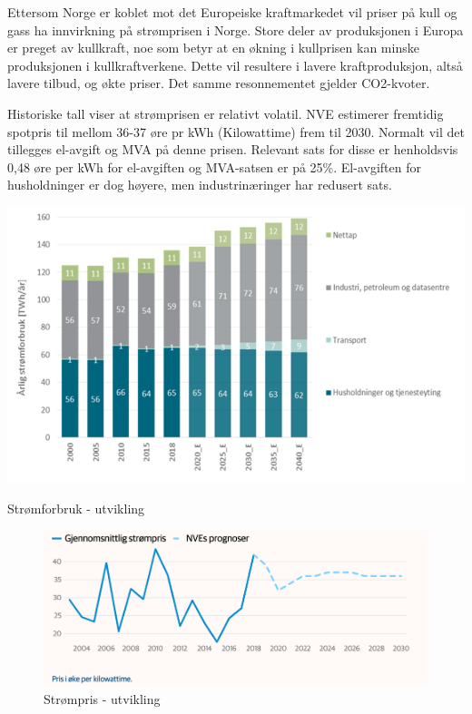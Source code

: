 \indent \newline
Ettersom Norge er koblet mot det Europeiske kraftmarkedet vil priser på kull og gass ha innvirkning på strømprisen i Norge. Store deler av produksjonen i Europa er preget av kullkraft, noe som betyr at en økning i kullprisen kan minske produksjonen i kullkraftverkene. Dette vil resultere i lavere kraftproduksjon, altså lavere tilbud, og økte priser. Det samme resonnementet gjelder CO2-kvoter.

\indent \newline
Historiske tall viser at strømprisen er relativt volatil. NVE estimerer fremtidig spotpris til mellom 36-37 øre pr kWh (Kilowattime) frem til 2030. Normalt vil det tillegges el-avgift og MVA på denne prisen. Relevant sats for disse er henholdsvis 0,48 øre per kWh for el-avgiften og MVA-satsen er på 25\%. El-avgiften for husholdninger er dog høyere, men industrinæringer har redusert sats.

\begin{table}[H]
  \includegraphics[width=\linewidth]{tabeller/stromforbruk.png}
  \caption{Strømforbruk - utvikling}
  \label{tbl:stromforbruk}
\end{table}

\begin{figure}[H]
  \includegraphics[width=\linewidth]{bilder/strompris.png}
  \caption{Strømpris - utvikling}
  \label{fig:strompris}
\end{figure}



 